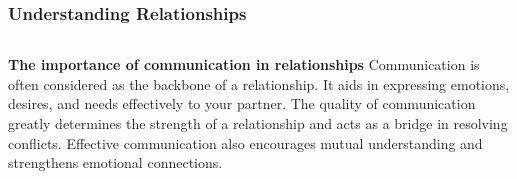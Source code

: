\documentclass[5pt]{beamer}
\begin{document}
\begin{frame}
\frametitle{Understanding Relationships}
\begin{columns}
\begin{column}{0.7\textwidth}
\begin{block}{\textbf{The importance of communication in relationships}}
Communication is often considered as the backbone of a relationship. It aids in expressing emotions, desires, and needs effectively to your partner. The quality of communication greatly determines the strength of a relationship and acts as a bridge in resolving conflicts. Effective communication also encourages mutual understanding and strengthens emotional connections.
\end{block}
\end{column}
\end{columns}
\end{frame}
\end{document}
